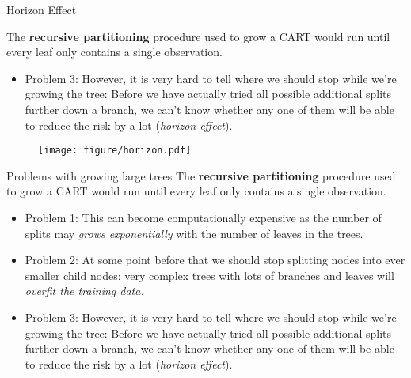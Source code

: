 \documentclass[11pt,compress,t,notes=noshow, xcolor=table]{beamer}
\begin{document}
\begin{vbframe}{Horizon Effect}

The \textbf{recursive partitioning} procedure used to grow a CART would run until every leaf only contains a single observation. 
\begin{itemize}
\item Problem 3: However, it is very hard to tell where we should stop while we're growing the tree: Before we have actually tried all possible additional splits further down a branch, we can't know whether any one of them will be able to reduce the risk by a lot (\emph{horizon effect}).
\end{itemize}

\begin{figure}
\centering
\texttt{[image: figure/horizon.pdf]}
\end{figure}


\end{vbframe}

\begin{vbframe}{Problems with growing large trees}
The \textbf{recursive partitioning} procedure used to grow a CART would run until every leaf only contains a single observation. 
\begin{itemize}
\item Problem 1: This can become computationally expensive as the number of splits may \emph{grows exponentially} with the number of leaves in the trees.
\item Problem 2: At some point before that we should stop splitting nodes into ever smaller child nodes: very complex trees with lots of branches and leaves will \emph{overfit the training data.}
\item Problem 3: However, it is very hard to tell where we should stop while we're growing the tree: Before we have actually tried all possible additional splits further down a branch, we can't know whether any one of them will be able to reduce the risk by a lot (\emph{horizon effect}).
\end{itemize}
\end{vbframe}
\end{document}
